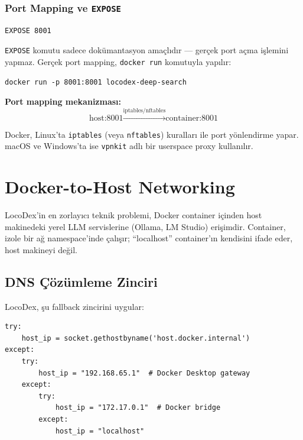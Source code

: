 \subsubsection{Port Mapping ve \texttt{EXPOSE}}

\begin{verbatim}
EXPOSE 8001
\end{verbatim}

\texttt{EXPOSE} komutu sadece dok\"{u}mantasyon ama\c{c}l{\i}d{\i}r --- ger\c{c}ek port a\c{c}ma i\c{s}lemini yapmaz. Ger\c{c}ek port mapping, \texttt{docker run} komutuyla yap{\i}l{\i}r:

\begin{verbatim}
docker run -p 8001:8001 locodex-deep-search
\end{verbatim}

\textbf{Port mapping mekanizmas{\i}:}
\begin{equation}
\text{host:8001} \xrightarrow{\text{iptables/nftables}} \text{container:8001}
\end{equation}

Docker, Linux'ta \texttt{iptables} (veya \texttt{nftables}) kurallar{\i} ile port y\"{o}nlendirme yapar. macOS ve Windows'ta ise \texttt{vpnkit} adl{\i} bir userspace proxy kullan{\i}l{\i}r.

\section{Docker-to-Host Networking}
\label{sec:docker-networking}

LocoDex'in en zorlayıcı teknik problemi, Docker container i\c{c}inden host makinedeki yerel LLM servislerine (Ollama, LM Studio) eri\c{s}imdir. Container, izole bir a\u{g} namespace'inde \c{c}al{\i}\c{s}{\i}r; ``localhost'' container'{\i}n kendisini ifade eder, host makineyi de\u{g}il.

\subsection{DNS \c{C}\"{o}z\"{u}mleme Zinciri}

LocoDex, \c{s}u fallback zincirini uygular:

\begin{verbatim}
try:
    host_ip = socket.gethostbyname('host.docker.internal')
except:
    try:
        host_ip = "192.168.65.1"  # Docker Desktop gateway
    except:
        try:
            host_ip = "172.17.0.1"  # Docker bridge
        except:
            host_ip = "localhost"
\end{verbatim}

